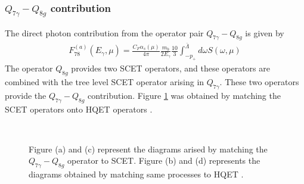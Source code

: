 \subsubsection{$Q_{7\gamma}-Q_{8g}$ contribution}
\vspace{-0.3cm}
The direct photon contribution from the operator pair $Q_{7\gamma}-Q_{8g}$ is given by
\begin{eqnarray}
F_{78}^{(a)}\left(E_{\gamma}, \mu\right)=\frac{C_{F} \alpha_{s}(\mu)}{4 \pi} \frac{m_{b}}{2 E_{\gamma}} \frac{10}{3} \int_{-p_{+}}^{\bar{\Lambda}} d \omega S(\omega, \mu)
\end{eqnarray}
The operator $Q_{8g}$ provides two SCET operators, and these operators are combined with the tree level SCET operator arising in $Q_{7\gamma}$. These two operators provide the $Q_{7\gamma}-Q_{8g}$ contribution.
Figure \ref{fig:Q1Q8} was obtained by matching the SCET operators onto HQET operators  \cite{Benzke:2010js}.
\begin{figure}[H]
\\
\caption{\label{fig:Q1Q8}Figure (a) and (c) represent the diagrams arised by matching the $Q_{7\gamma}-Q_{8g}$ operator to SCET. Figure (b) and (d) represents the diagrams obtained by matching same processes to HQET \cite{Benzke:2010js}.}
\end{figure} 
